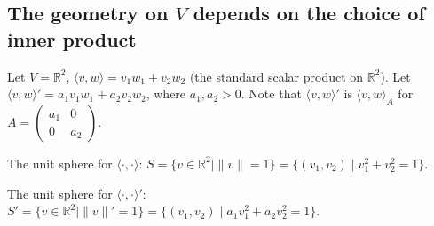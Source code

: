 \subsection*{The geometry on \texorpdfstring{$V$}{V} depends on the choice of inner product}

\begin{example}
    Let $V = \mathbb{R}^2$, $\langle v, w \rangle = v_1 w_1 + v_2 w_2$ (the standard scalar product on $\mathbb{R}^2$). Let $\langle v, w \rangle' = a_1 v_1 w_1 + a_2 v_2 w_2$, where $a_1, a_2 > 0$. Note that $\langle v, w \rangle'$ is $\langle v, w \rangle_A$ for $A = \left(\begin{smallmatrix} a_1 & 0 \\ 0 & a_2 \end{smallmatrix}\right)$.
    
    The unit sphere for $\langle \cdot, \cdot \rangle$: $S = \{v \in \mathbb{R}^2 \mid \|v\| = 1\} = \{(v_1, v_2) \mid v_1^2 + v_2^2 = 1\}$.
    
    The unit sphere for $\langle \cdot, \cdot \rangle'$: $S' = \{v \in \mathbb{R}^2 \mid \|v\|' = 1\} = \{(v_1, v_2) \mid a_1 v_1^2 + a_2 v_2^2 = 1\}$.

    \begin{center}
    \end{center}
\end{example}

